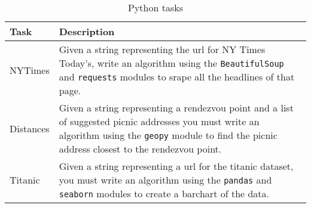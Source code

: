 \begin{table}
\centering
\caption{Python tasks}
\begin{scriptsize}
\begin{tabular}{ll}
\hline
\textbf{Task} & \textbf{Description}                                                                                         \\
\hline
\hline
NYTimes       &
\parbox[l][1cm][c]{11cm}{Given a string representing the url for NY Times Today's,
    write an algorithm using the \texttt{BeautifulSoup} and \texttt{requests} modules to srape all the headlines of that page.}
\\
%
Distances     &
\parbox[l][1.2cm][c]{11cm}{Given a string representing a rendezvou point and a list of suggested picnic addresses
    you must write an algorithm using the \texttt{geopy} module to find the  picnic address closest to the rendezvou point.} \\
%
Titanic       &
\parbox[l][1cm][c]{11cm}{Given a string representing a url for the titanic dataset,
    you must write an algorithm using the \texttt{pandas} and \texttt{seaborn} modules to create a barchart of the data.}    \\
\hline
\end{tabular}
\end{scriptsize}
\smallskip
\label{tbl:python-tasks-modules}
\end{table}

